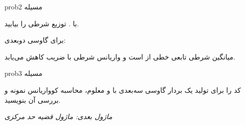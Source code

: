 \begin{PSbox}[unbreakable]{prob}{مسیله 2}

 با . توزیع شرطی  را بیابید.

\PSsolution{} برای گاوسی دوبعدی:\PSbr{}\PSbr{}

میانگین شرطی تابعی خطی از  است و واریانس شرطی با ضریب  کاهش می‌یابد.

\end{PSbox}

\begin{PSbox}[unbreakable]{prob}{مسیله 3}

کد  را برای تولید یک بردار گاوسی سه‌بعدی با \lr{\ensuremath{\mu}} و \lr{\ensuremath{\Sigma}} معلوم، محاسبه کوواریانس نمونه و بررسی آن بنویسید.

\PSsolution{} 


\begin{Shaded}
\begin{Highlighting}[]
 \OperatorTok{=}\NormalTok{ [}\OperatorTok{;} \OperatorTok{;} \OperatorTok{{-}}\NormalTok{]}\OperatorTok{;}
 \OperatorTok{=}\NormalTok{ [}  \OperatorTok{;}   \OperatorTok{{-}}\OperatorTok{;}  \OperatorTok{{-}} \NormalTok{]}\OperatorTok{;}
 \OperatorTok{=} \OperatorTok{;}
 \OperatorTok{=} \NormalTok{(}\OperatorTok{\textquotesingle{},} \OperatorTok{,} \NormalTok{)}\OperatorTok{;}
\NormalTok{(}\NormalTok{)}\OperatorTok{;} \NormalTok{(}\NormalTok{(}\NormalTok{)}\OperatorTok{\textquotesingle{}}\NormalTok{)}\OperatorTok{;}
\NormalTok{(}\NormalTok{)}\OperatorTok{;} \NormalTok{(}\NormalTok{(}\NormalTok{))}\OperatorTok{;}
\end{Highlighting}
\end{Shaded}

\emph{ماژول بعدی: {ماژول  قضیه حد مرکزی}}\PSbr{}

\end{PSbox}
